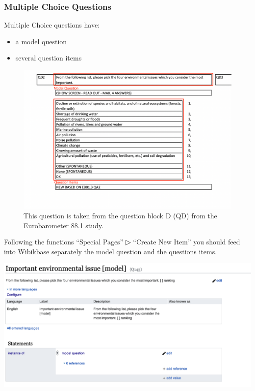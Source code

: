 \documentclass[
  letterpaper,
  DIV=11,
  numbers=noendperiod]{scrreprt}
\begin{document}
\subsubsection{Multiple Choice
Questions}\label{multiple-choice-questions}

Multiple Choice questions have:

\begin{itemize}
\item
  a model question
\item
  several question items
\end{itemize}

\begin{figure}[H]

{\centering \includegraphics{png/question_to_wikibase/question_multipleChoice_6x4.png}

}

\caption{This question is taken from the question block D (QD) from the
Eurobarometer 88.1 study.}

\end{figure}%

Following the functions ``Special Pages'' ▷ ``Create New Item'' you
should feed into Wibikbase separately the model question and the
questions items.

\begin{center}
\includegraphics{png/question_to_wikibase/multipleChoiceQuestion_modelQuestion_2x1.png}
\end{center}
\end{document}
